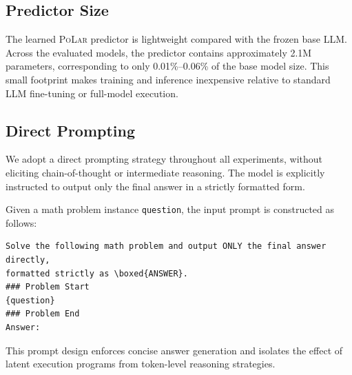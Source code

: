 \documentclass{article}
\theoremstyle{plain}
\theoremstyle{definition}
\theoremstyle{remark}
\newcommand\ours{\textsc{PoLar}\xspace}
\begin{document}
\subsection{Predictor Size}
\label{app:predictor_size}

The learned \ours predictor is lightweight compared with the frozen base LLM.
Across the evaluated models, the predictor contains approximately 2.1M
parameters, corresponding to only 0.01\%--0.06\% of the base model size.
This small footprint makes training and inference inexpensive relative to
standard LLM fine-tuning or full-model execution.

\begin{table}[h]
\centering
\caption{
Parameter size of the learned \ours predictor compared with each frozen base LLM.
}
\label{tab:predictor_size}
\end{table}


\subsection{Direct Prompting}
We adopt a direct prompting strategy throughout all experiments, without eliciting chain-of-thought or intermediate reasoning. The model is explicitly instructed to output only the final answer in a strictly formatted form.

Given a math problem instance \texttt{question}, the input prompt is constructed as follows:
\begin{verbatim}
Solve the following math problem and output ONLY the final answer directly, 
formatted strictly as \boxed{ANSWER}.
### Problem Start
{question}
### Problem End
Answer:
\end{verbatim}

This prompt design enforces concise answer generation and isolates the effect of latent execution programs from token-level reasoning strategies.
\end{document}
